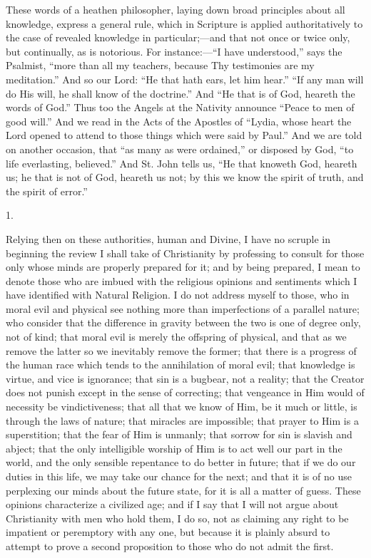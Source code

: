 These words of a heathen philosopher, laying down broad principles
about all knowledge, express a general rule, which in Scripture is
applied authoritatively to the case of revealed knowledge in
particular;—and that not once or twice only, but continually, as is
notorious. For instance:—``I have understood,'' says the
Psalmist, ``more than all my teachers, because Thy testimonies are
my meditation.'' And so our Lord: ``He that hath ears, let him
hear.'' ``If any man will do His will, he shall know of the
doctrine.'' And ``He that is of God, heareth the words of
God.'' Thus too the Angels at the Nativity announce ``Peace to
men of good will.'' And we read in the Acts of the Apostles of
``Lydia, whose heart the Lord opened to attend to those things
which were said by Paul.'' And we are told on another occasion,
that ``as many as were ordained,'' or disposed by God,
``to life everlasting, believed.'' And St. John tells us,
``He that knoweth God, heareth us; he that is not of God, heareth
us not; by this we know the spirit of truth, and the spirit of
error.''

1.

Relying then on these authorities, human and Divine, I have no
scruple in beginning the review I shall take of Christianity by
professing to consult for those only whose minds are properly prepared
for it; and by being prepared, I mean to denote those who are
imbued with the religious opinions and sentiments which I have
identified with Natural Religion. I do not address myself to those,
who in moral evil and physical see nothing more than imperfections of
a parallel nature; who consider that the difference in gravity between
the two is one of degree only, not of kind; that moral evil is merely
the offspring of physical, and that as we remove the latter so we
inevitably remove the former; that there is a progress of the human
race which tends to the annihilation of moral evil; that knowledge is
virtue, and vice is ignorance; that sin is a bugbear, not a reality;
that the Creator does not punish except in the sense of correcting;
that vengeance in Him would of necessity be vindictiveness; that all
that we know of Him, be it much or little, is through the laws of
nature; that miracles are impossible; that prayer to Him is a
superstition; that the fear of Him is unmanly; that sorrow for sin is
slavish and abject; that the only intelligible worship of Him is to
act well our part in the world, and the only sensible repentance to do
better in future; that if we do our duties in this life, we may take
our chance for the next; and that it is of no use perplexing our minds
about the future state, for it is all a matter of guess. These
opinions characterize a civilized age; and if I say that I will not
argue about Christianity with men who hold them, I do so, not as
claiming any right to be impatient or peremptory with any one, but
because it is plainly absurd to attempt to prove a second proposition
to those who do not admit the first.

